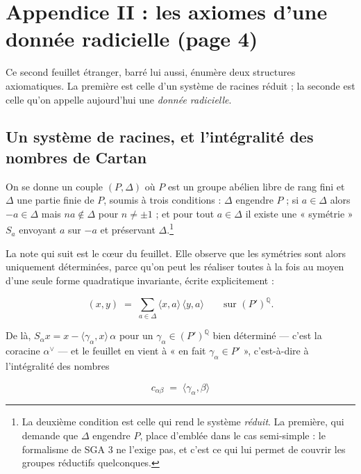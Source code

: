 \documentclass[11pt,a4paper]{article}
\begin{document}
\section*{Appendice II : les axiomes d'une donnée radicielle (page 4)}

Ce second feuillet étranger, barré lui aussi, énumère deux structures
axiomatiques. La première est celle d'un système de racines réduit ; la seconde
est celle qu'on appelle aujourd'hui une \emph{donnée radicielle}.

\subsection*{Un système de racines, et l'intégralité des nombres de Cartan}

On se donne un couple $(P, \Delta)$ où $P$ est un groupe abélien libre de rang
fini et $\Delta$ une partie finie de $P$, soumis à trois conditions :
$\Delta$ engendre $P$ ; si $a \in \Delta$ alors $-a\in\Delta$ mais
$na\notin\Delta$ pour $n\neq \pm 1$ ; et pour tout $a\in\Delta$ il existe une
« symétrie » $S_{a}$ envoyant $a$ sur $-a$ et préservant
$\Delta$.\footnote{La deuxième condition est celle qui rend le système
\emph{réduit}. La première, qui demande que $\Delta$ engendre $P$, place
d'emblée dans le cas semi-simple : le formalisme de SGA 3 ne l'exige pas, et
c'est ce qui lui permet de couvrir les groupes réductifs quelconques.}

La note qui suit est le cœur du feuillet. Elle observe que les symétries
sont alors uniquement déterminées, parce qu'on peut les réaliser toutes à la
fois au moyen d'une seule forme quadratique invariante, écrite explicitement :

\[
  (x,y) \;=\; \sum_{a\in\Delta} \langle x, a\rangle\,\langle y, a\rangle
  \qquad \text{sur } (P')^{\mathbb{Q}} .
\]

De là, $S_{\alpha}x = x - \langle\gamma_{\alpha}, x\rangle\,\alpha$ pour un
$\gamma_{\alpha}\in (P')^{\mathbb{Q}}$ bien déterminé — c'est la coracine
$\alpha^{\vee}$ — et le feuillet en vient à « en fait $\gamma_{\alpha} \in
P'$ », c'est-à-dire à l'intégralité des nombres

\[
  c_{\alpha\beta} \;=\; \langle\gamma_{\alpha},\beta\rangle
\]
\end{document}
